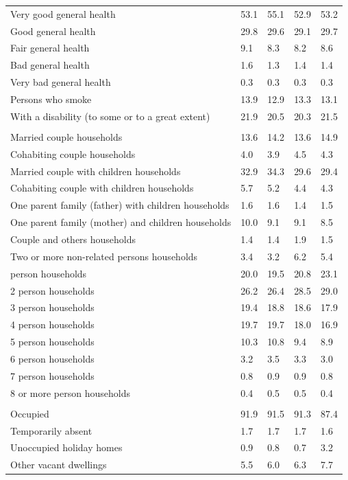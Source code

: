 \documentclass{article}
\begin{document}
\begin{table}[h]
\begin{tabular}{KTTTT}
    \hline
Very good general health & 53.1& 55.1&52.9& 53.2\\
Good general health & 29.8& 29.6& 29.1& 29.7\\
Fair general health & 9.1& 8.3&8.2& 8.6\\
Bad general health & 1.6& 1.3&1.4& 1.4\\
Very bad general health & 0.3& 0.3&0.3& 0.3\\
    \hline
Persons who smoke & 13.9& 12.9&13.3& 13.1\\
    \hline
With a disability (to some or to a great extent) & 21.9& 20.5&20.3& 21.5\\
\hline
    \\ 
    \hline
Married couple households & 13.6& 14.2& 13.6& 14.9\\
Cohabiting couple households & 4.0& 3.9& 4.5& 4.3\\
Married couple with children households & 32.9& 34.3& 29.6& 29.4\\
Cohabiting couple with children households & 5.7& 5.2& 4.4& 4.3\\
One parent family (father) with  children households & 1.6& 1.6& 1.4& 1.5\\
One parent family (mother) and children households & 10.0&  9.1&  9.1&  8.5\\
Couple and others households  & 1.4& 1.4& 1.9& 1.5\\
Two or more non-related persons households & 3.4& 3.2& 6.2& 5.4\\
     person households & 20.0& 19.5& 20.8& 23.1\\
2 person households & 26.2& 26.4& 28.5& 29.0\\
3 person households & 19.4& 18.8& 18.6& 17.9\\
4 person households & 19.7& 19.7& 18.0& 16.9\\
5 person households & 10.3& 10.8&  9.4&  8.9\\
6 person households & 3.2& 3.5& 3.3& 3.0\\
7 person households & 0.8& 0.9& 0.9& 0.8\\
8 or more person households & 0.4& 0.5& 0.5& 0.4\\
\hline
    \\ 
    \hline
Occupied & 91.9& 91.5& 91.3& 87.4\\
Temporarily absent & 1.7& 1.7& 1.7& 1.6\\
Unoccupied holiday homes & 0.9& 0.8& 0.7& 3.2\\
Other vacant dwellings & 5.5& 6.0& 6.3& 7.7\\
\hline
\end{tabular}
\end{table}
\end{document}
